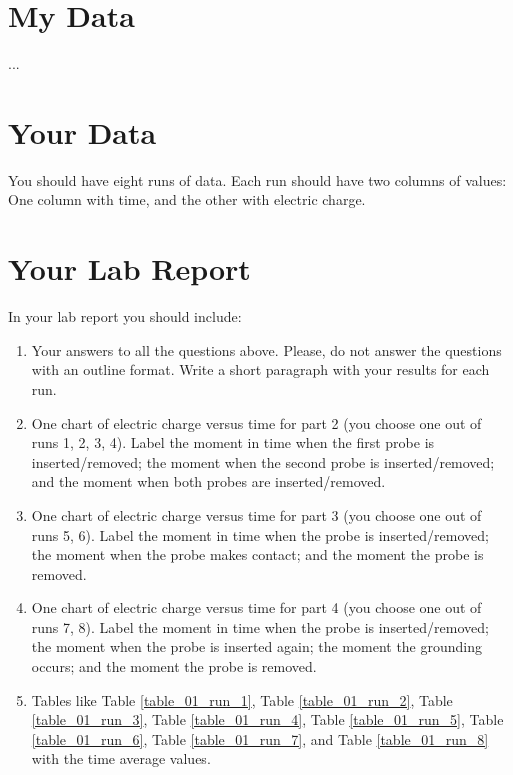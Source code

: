 \section{My Data}
...
\section{Your Data}
You should have eight runs of data. Each run should have two columns of values: One column with time, and the other with electric charge.
\newpage
\section{Your Lab Report}
In your lab report you should include:
\begin{enumerate}
	\item Your answers to all the questions above. Please, do not answer the questions with an outline format. Write a short paragraph with your results for each run.
	\item One chart of electric charge versus time for part 2 (you choose one out of runs 1, 2, 3, 4). Label the moment in time when the first probe is inserted/removed; the moment when the second probe is inserted/removed; and the moment when both probes are inserted/removed.
	\item One chart of electric charge versus time for part 3 (you choose one out of runs 5, 6). Label the moment in time when the probe is inserted/removed; the moment when the probe makes contact; and the moment the probe is removed.
	\item One chart of electric charge versus time for part 4 (you choose one out of runs 7, 8). Label the moment in time when the probe is inserted/removed; the moment when the probe is inserted again; the moment the grounding occurs; and the moment the probe is removed.
	\item Tables like Table \ref{table_01_run_1}, Table \ref{table_01_run_2}, Table \ref{table_01_run_3}, Table \ref{table_01_run_4}, Table \ref{table_01_run_5}, Table \ref{table_01_run_6}, Table \ref{table_01_run_7}, and Table \ref{table_01_run_8} with the time average values.
\end{enumerate}
\newpage
